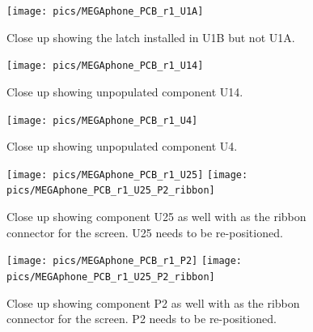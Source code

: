 \begin{figure} \begin{center}
\texttt{[image: pics/MEGAphone\_PCB\_r1\_U1A]} 
\end{center} 
\caption{Close up showing the latch installed in U1B but not U1A.\\}
\label{MEGAphone_PCB_r1_U1A}
\end{figure}

\begin{figure} \begin{center}
\texttt{[image: pics/MEGAphone\_PCB\_r1\_U14]} 
\end{center} 
\caption{Close up showing unpopulated component U14.\\}
\label{MEGAphone_PCB_r1_U14}
\end{figure}

\begin{figure} \begin{center}
\texttt{[image: pics/MEGAphone\_PCB\_r1\_U4]} 
\end{center} 
\caption{Close up showing unpopulated component U4.\\}
\label{MEGAphone_PCB_r1_U4}
\end{figure}

\begin{figure} \begin{center}
\texttt{[image: pics/MEGAphone\_PCB\_r1\_U25]}
\texttt{[image: pics/MEGAphone\_PCB\_r1\_U25\_P2\_ribbon]}
\end{center} 
\caption{Close up showing component U25 as well with as the ribbon connector for the screen. U25 needs to be re-positioned.\\}
\label{MEGAphone_PCB_r1_U25}
\end{figure}

\begin{figure} \begin{center}
\texttt{[image: pics/MEGAphone\_PCB\_r1\_P2]}
\texttt{[image: pics/MEGAphone\_PCB\_r1\_U25\_P2\_ribbon]}
\end{center} 
\caption{Close up showing component P2 as well with as the ribbon connector for the screen. P2 needs to be re-positioned. \\}
\label{MEGAphone_PCB_r1_P2}
\end{figure}


